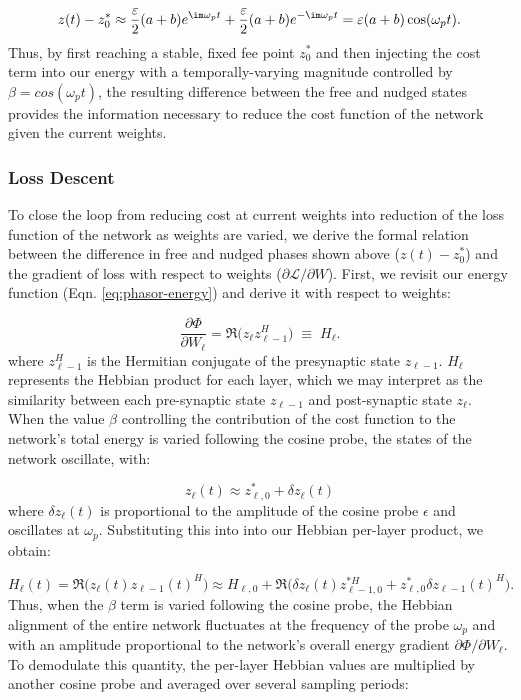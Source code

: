 \begin{equation}
z(t) - z_0^* \approx \frac{\varepsilon}{2}(a+b) e^{\im\omega_p t} + \frac{\varepsilon}{2}(a+b) e^{-\im\omega_p t} = \varepsilon(a+b)\cos(\omega_p t).
\end{equation}
Thus, by first reaching a stable, fixed fee point $z_0^*$ and then injecting the cost term into our energy with a temporally-varying magnitude controlled by $\beta=cos(\omega_p t)$, the resulting difference between the free and nudged states provides the information necessary to reduce the cost function of the network given the current weights.

\subsubsection{Loss Descent}

To close the loop from reducing cost at current weights into reduction of the loss function of the network as weights are varied, we derive the formal relation between the difference in free and nudged phases shown above ($z(t) - z_0^*$) and the gradient of loss with respect to weights ($\partial \mathcal{L} / \partial W$). First, we revisit our energy function (Eqn. \ref{eq:phasor-energy}) and derive it with respect to weights: 

\begin{equation}
\frac{\partial \Phi}{\partial W_\ell} = \Re\big( z_\ell z_{\ell-1}^H \big) \;\equiv\; H_\ell.
\end{equation}
where $z_{\ell-1}^H$ is the Hermitian conjugate of the presynaptic state $z_{\ell-1}$. $H_\ell$ represents the Hebbian product for each layer, which we may interpret as the similarity between each pre-synaptic state $z_{\ell-1}$ and post-synaptic state $z_\ell$. When the value $\beta$ controlling the contribution of the cost function to the network's total energy is varied following the cosine probe, the states of the network oscillate, with:

\begin{equation}
    z_\ell(t) \approx z_{\ell,0}^* + \delta z_\ell(t)
\end{equation}
where $\delta z_\ell(t)$ is proportional to the amplitude of the cosine probe $\epsilon$ and oscillates at $\omega_p$. Substituting this into into our Hebbian per-layer product, we obtain:

\begin{equation}
H_\ell(t) = \Re\big( z_\ell(t) z_{\ell-1}(t)^H \big)
\approx H_{\ell,0} + \Re\big( \delta z_\ell(t) z_{\ell-1,0}^{*H} + z_{\ell,0}^* \delta z_{\ell-1}(t)^H \big).
\end{equation}
Thus, when the $\beta$ term is varied following the cosine probe, the Hebbian alignment of the entire network fluctuates at the frequency of the probe $\omega_p$ and with an amplitude proportional to the network's overall energy gradient ${\partial \Phi}/{\partial W_\ell}$. To demodulate this quantity, the per-layer Hebbian values are multiplied by another cosine probe and averaged over several sampling periods:

